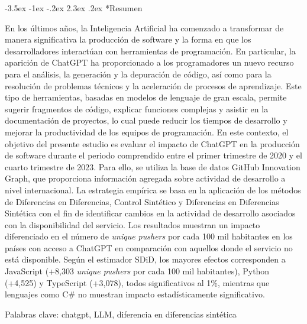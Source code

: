 \documentclass[12pt,a4paper]{article}
\makeatletter
\renewcommand\section{\@startsection{section}{1}{\z@}%
  {-3.5ex \@plus -1ex \@minus -.2ex}%
  {2.3ex \@plus.2ex}%
  {\normalfont\normalsize}}
\makeatother
\begin{document}
\pagestyle{empty}
\setcounter{page}{1}

\begin{singlespacing}
\section*{\centering\normalfont Resumen}

En los últimos años, la Inteligencia Artificial ha comenzado a transformar de manera significativa la producción de software y la forma en que los desarrolladores interactúan con herramientas de programación. En particular, la aparición de ChatGPT ha proporcionado a los programadores un nuevo recurso para el análisis, la generación y la depuración de código, así como para la resolución de problemas técnicos y la aceleración de procesos de aprendizaje. Este tipo de herramientas, basadas en modelos de lenguaje de gran escala, permite sugerir fragmentos de código, explicar funciones complejas y asistir en la documentación de proyectos, lo cual puede reducir los tiempos de desarrollo y mejorar la productividad de los equipos de programación. En este contexto, el objetivo del presente estudio es evaluar el impacto de ChatGPT en la producción de software durante el periodo comprendido entre el primer trimestre de 2020 y el cuarto trimestre de 2023. Para ello, se utiliza la base de datos GitHub Innovation Graph, que proporciona información agregada sobre actividad de desarrollo a nivel internacional. La estrategia empírica se basa en la aplicación de los métodos de Diferencias en Diferencias, Control Sintético y Diferencias en Diferencias Sintética con el fin de identificar cambios en la actividad de desarrollo asociados con la disponibilidad del servicio. Los resultados muestran un impacto diferenciado en el número de \textit{unique pushers} por cada 100 mil habitantes en los países con acceso a ChatGPT en comparación con aquellos donde el servicio no está disponible. Según el estimador SDiD, los mayores efectos corresponden a JavaScript (+8,303 \textit{unique pushers} por cada 100 mil habitantes), Python (+4,525) y TypeScript (+3,078), todos significativos al 1\%, mientras que lenguajes como C\# no muestran impacto estadísticamente significativo.

\vspace{\baselineskip}

Palabras clave: chatgpt, LLM, diferencia en diferencias sintética

\end{singlespacing}
\clearpage
\end{document}
